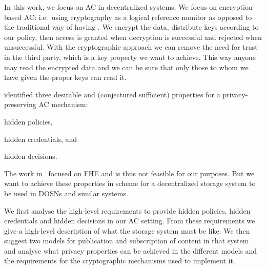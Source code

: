 In this work, we focus on \ac{AC} in decentralized systems.
We focus on encryption-based \ac{AC}: i.e.\ using cryptography as a logical 
reference monitor as opposed to the traditional way of having .
We encrypt the data, distribute keys according to our policy, then access is 
granted when decryption is successful and rejected when unsuccessful.
With the cryptographic approach we can remove the need for trust in the third 
party, which is a key property we want to achieve.
This way anyone may read the encrypted data and we can be sure that only those 
to whom we have given the proper keys can read it.

%

\citet{TowardsPPACwHPHCHD} identified three desirable and (conjectured 
sufficient) properties for a privacy-preserving \ac{AC} mechanism:
\begin{inparablank}
\item hidden policies,
\item hidden credentials, and
\item hidden decisions.
\end{inparablank}
The work in~\cite{TowardsPPACwHPHCHD} focused on \ac{FHE} and is thus not 
feasible for our purposes.
But we want to achieve these properties in  scheme for a decentralized 
storage system to be used in \acp{DOSN} and similar systems.

We first analyse the high-level requirements to provide hidden policies, hidden 
credentials and hidden decisions in our \ac{AC} setting.
From these requirements we give a high-level description of what the storage 
system must be like.
We then suggest two models for publication and subscription of content in that 
system and analyse what privacy properties can be achieved in the different 
models and the requirements for the cryptographic mechanisms used to implement 
it.


